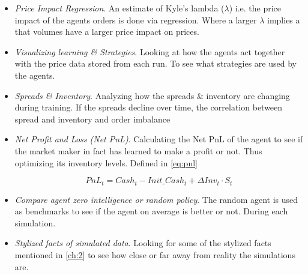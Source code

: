 \documentclass{kththesis}
\theoremstyle{definition}
\begin{document}
\begin{itemize}
\item \textit{Price Impact Regression}. An estimate of Kyle's lambda ($\lambda$) i.e. the price impact of the agents orders is done via regression. Where a larger $\lambda$ implies a that volumes have a larger price impact on prices.

\item \textit{Visualizing learning \& Strategies}. Looking at how the agents act together with the price data stored from each run. To see what strategies are used by the agents.
    
\item \textit{Spreads \& Inventory}. Analyzing how the spreads \& inventory are changing during training. If the spreads decline over time, the correlation between spread and inventory and order imbalance

\item \textit{Net Profit and Loss (Net PnL)}. Calculating the Net PnL of the agent to see if the market maker in fact has learned to make a profit or not. Thus optimizing its inventory levels. Defined in \autoref{eq:pnl}

\begin{equation}
    PnL_{t} = Cash_{t} - Init\_Cash_{t} + \Delta Inv_{t} \cdot S_{t}
    \label{eq:pnl}
\end{equation}

\item \textit{Compare agent zero intelligence or  random policy}. The random agent is used as benchmarks to see if the agent on average is better or not. During each simulation.

\item \textit{Stylized facts of simulated data}.
Looking for some of the stylized facts mentioned in \autoref{ch:2} to see how close or far away from reality the simulations are.



\end{itemize}
\end{document}
